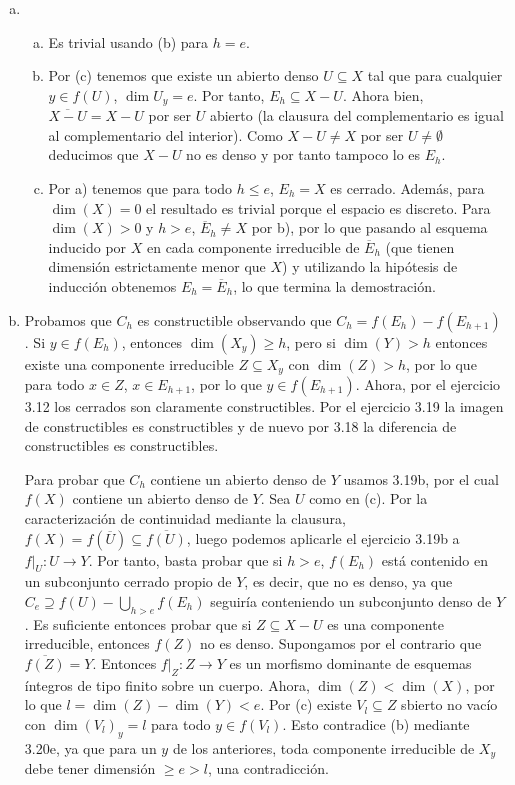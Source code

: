 \documentclass[twoside]{article}
\begin{document}
\begin{solucion}
\begin{enumerate}[(a)]
\item \begin{enumerate}[a)]
\item Es trivial usando (b) para $h=e$. 
\item Por (c) tenemos que existe un abierto denso $U\subseteq X$ tal que para cualquier $y\in f(U)$, $\dim U_y=e$. Por tanto, $E_h\subseteq X-U$. Ahora bien, $\overline{X-U}=X-U$ por ser $U$ abierto (la clausura del complementario es igual al complementario del interior). Como $X-U\neq X$ por ser $U\neq\emptyset$ deducimos que $X-U$ no es denso y por tanto tampoco lo es $E_h$. 
\item Por a) tenemos que para todo $h\leq e$, $E_h=X$ es cerrado. Además, para $\dim(X)=0$ el resultado es trivial porque el espacio es discreto. Para $\dim(X)>0$ y $h>e$, $\overline{E}_h\neq X$ por b), por lo que pasando al esquema inducido por $X$ en cada componente irreducible de $\overline{E}_h$ (que tienen dimensión estrictamente menor que $X$) y utilizando la hipótesis de inducción obtenemos $E_h=\overline{E}_h$, lo que termina la demostración.
\end{enumerate}%

\item Probamos que $C_h$ es constructible observando que $C_h=f(E_h)-f(E_{h+1})$. Si $y\in f(E_h)$, entonces $\dim(X_y)\geq h$, pero si $\dim(Y)>h$ entonces existe una componente irreducible $Z\subseteq X_y$ con $\dim(Z)>h$, por lo que para todo $x\in Z$, $x\in E_{h+1}$, por lo que $y\in f(E_{h+1})$. Ahora, por el ejercicio 3.12 los cerrados son claramente constructibles. Por el ejercicio 3.19 la imagen de constructibles es constructibles y de nuevo por 3.18 la diferencia de constructibles es constructibles.

Para probar que $C_h$ contiene un abierto denso de $Y$ usamos 3.19b, por el cual $f(X)$ contiene un abierto denso de $Y$. Sea $U$ como en (c). Por la caracterización de continuidad mediante la clausura, $f(X)=f(\overline{U})\subseteq \overline{f(U)}$, luego podemos aplicarle el ejercicio 3.19b a $f|_U:U\to Y$. Por tanto, basta probar que si $h>e$, $f(E_h)$ está contenido en un subconjunto cerrado propio de $Y$, es decir, que no es denso, ya que $C_e\supseteq f(U)-\bigcup_{h>e}f(E_h)$ seguiría conteniendo un subconjunto denso de $Y$. Es suficiente entonces probar que si $Z\subseteq X-U$ es una componente irreducible, entonces $f(Z)$ no es denso. Supongamos por el contrario que $\overline{f(Z)}=Y$. Entonces $f|_Z:Z\to Y$ es un morfismo dominante de esquemas íntegros de tipo finito sobre un cuerpo. Ahora, $\dim(Z)<\dim(X)$, por lo que $l=\dim(Z)-\dim(Y)<e$. Por (c) existe $V_l\subseteq Z$ sbierto no vacío con $\dim(V_l)_y=l$ para todo $y\in f(V_l)$. Esto contradice (b) mediante 3.20e, ya que para un $y$ de los anteriores, toda componente irreducible de $X_y$ debe tener dimensión $\geq e>l$, una contradicción.


\end{enumerate}
\end{solucion}
\end{document}
